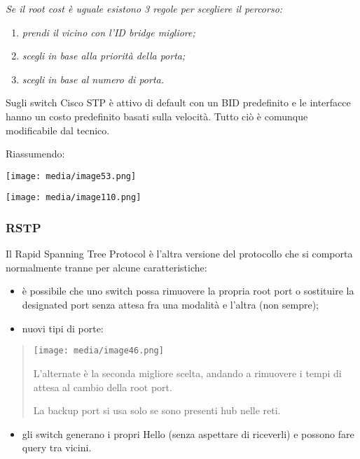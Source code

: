 \emph{Se il root cost è uguale esistono 3 regole per scegliere il
percorso:}

\begin{enumerate}
\def\labelenumi{\arabic{enumi}.}
\item
  \emph{prendi il vicino con l'ID bridge migliore;}
\item
  \emph{scegli in base alla priorità della porta;}
\item
  \emph{scegli in base al numero di porta.}
\end{enumerate}

Sugli switch Cisco STP è attivo di default con un BID predefinito e le
interfacce hanno un costo predefinito basati sulla velocità. Tutto ciò è
comunque modificabile dal tecnico.

Riassumendo:

\texttt{[image: media/image53.png]}

\texttt{[image: media/image110.png]}

\subsubsection{RSTP}\label{rstp}

Il Rapid Spanning Tree Protocol è l'altra versione del protocollo che si
comporta normalmente tranne per alcune caratteristiche:

\begin{itemize}
\item
  è possibile che uno switch possa rimuovere la propria root port o
  sostituire la designated port senza attesa fra una modalità e l'altra
  (non sempre);
\item
  nuovi tipi di porte:
\end{itemize}

\begin{quote}
\texttt{[image: media/image46.png]}

L'alternate è la seconda migliore scelta, andando a rimuovere i tempi di
attesa al cambio della root port.

La backup port si usa solo se sono presenti hub nelle reti.
\end{quote}

\begin{itemize}
\item
  gli switch generano i propri Hello (senza aspettare di riceverli) e
  possono fare query tra vicini.
\end{itemize}

